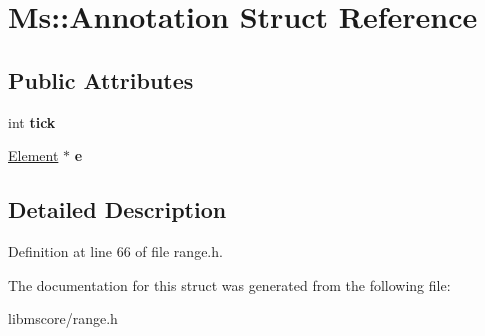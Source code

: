\hypertarget{struct_ms_1_1_annotation}{}\section{Ms\+:\+:Annotation Struct Reference}
\label{struct_ms_1_1_annotation}
\subsection*{Public Attributes}
\begin{DoxyCompactItemize}
\item 
\mbox{\label{struct_ms_1_1_annotation_a7f35c2650f18b18eb4eb463adc51972d}} 
int {\bfseries tick}
\item 
\mbox{\label{struct_ms_1_1_annotation_ab33967769423285814405299b76b16cb}} 
\hyperlink{class_ms_1_1_element}{Element} $\ast$ {\bfseries e}
\end{DoxyCompactItemize}


\subsection{Detailed Description}


Definition at line 66 of file range.\+h.



The documentation for this struct was generated from the following file\+:\begin{DoxyCompactItemize}
\item 
libmscore/range.\+h\end{DoxyCompactItemize}

